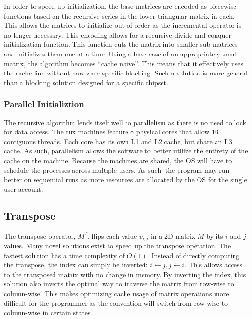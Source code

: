 \documentclass[conference]{IEEEtran}
\begin{document}
In order to speed up initialization, the base matrices are encoded as
piecewise functions based on the recursive series in the lower
triangular matrix in each. This allows the matrices to initialize out of
order as the incremental operator is no longer necessary. This encoding
allows for a recursive divide-and-conquer initialization function. This
function cuts the matrix into smaller sub-matrices and initializes them
one at a time. Using a base case of an appropriately small matrix, the
algorithm becomes ``cache naive''. This means that it effectively uses
the cache line without hardware specific blocking. Such a solution is
more general than a blocking solution designed for a specific chipset.

\subsubsection{Parallel Initializtion}\label{parallel-initializtion}

The recursive algorithm lends itself well to parallelism as there is no
need to lock for data access. The tux machines feature 8 physical cores
that allow 16 contiguous threads. Each core has its own L1 and L2 cache,
but share an L3 cache. As such, parallelism allows the software to
better utilize the entirety of the cache on the machine. Because the
machines are shared, the OS will have to schedule the processes across
multiple users. As such, the program may run better on sequential runs
as more resources are allocated by the OS for the single user account.

\subsection{Transpose}\label{transpose}

The transpose operator, \(M^T\), flips each value \(v_{i,j}\) in a 2D
matrix \(M\) by its \(i\) and \(j\) values. Many novel solutions exist
to speed up the transpose operation. The fastest solution has a time
complexity of \(O(1)\). Instead of directly computing the transpose, the
index can simply be inverted: \(i \leftarrow j, j \leftarrow i\). This
allows access to the transposed matrix with no change in memory. By
inverting the index, this solution also inverts the optimal way to
traverse the matrix from row-wise to column-wise. This makes optimizing
cache usage of matrix operations more difficult for the programmer as
the convention will switch from row-wise to column-wise in certain
states.
\end{document}

